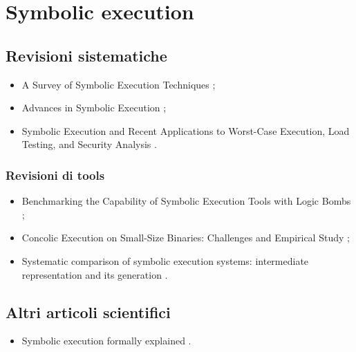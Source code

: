 \section*{Symbolic execution}

\subsection*{Revisioni sistematiche}
\begin{itemize}

\item A Survey of Symbolic Execution Techniques \cite{baldoni2018symbexereview};

\item Advances in Symbolic Execution \cite{yang2019symbexereview};

\item Symbolic Execution and Recent Applications to Worst-Case Execution, Load Testing, and Security Analysis \cite{pasareanu2019symbexereview}.

\end{itemize}

\subsubsection*{Revisioni di tools}
\begin{itemize}

\item Benchmarking the Capability of Symbolic Execution Tools with Logic Bombs \cite{xu2020symbexetools};

\item Concolic Execution on Small-Size Binaries: Challenges and Empirical Study \cite{xu2017symbexetools};

\item Systematic comparison of symbolic execution systems: intermediate representation and its generation \cite{poeplau2019symbexetools}.

\end{itemize}

\subsection*{Altri articoli scientifici}
\begin{itemize}

\item Symbolic execution formally explained \cite{boer2021symbexe}.

\end{itemize}

